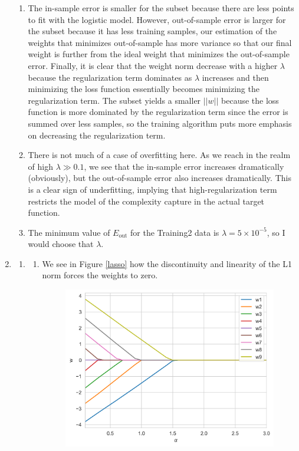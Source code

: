 \documentclass[12pt]{article}
\begin{document}
\begin{enumerate}[leftmargin=*]
\begin{enumerate}[label = \Alph*.]
\item The in-sample error is smaller for the subset because there are less points to fit with the logistic model. However, out-of-sample error is larger for the subset because it has less training samples, our estimation of the weights that minimizes out-of-sample has more variance so that our final weight is further from the ideal weight that minimizes the out-of-sample error. Finally, it is clear that the weight norm decrease with a higher $\lambda$ because the regularization term dominates as $\lambda$ increases and then minimizing the loss function essentially becomes minimizing the regularization term. The subset yields a smaller $||w||$ because the loss function is more dominated by the regularization term since the error is summed over less samples, so the training algorithm puts more emphasis on decreasing the regularization term.
\item There is not much of a case of overfitting here. As we reach in the realm of high $\lambda \gg 0.1$, we see that the in-sample error increases dramatically (obviously), but the out-of-sample error also increases dramatically. This is a clear sign of underfitting, implying that high-regularization term restricts the model of the complexity capture in the actual target function.
\item The minimum value of $E_{\text{out}}$ for the Training2 data is $\lambda = 5 \times 10^{-5}$, so I would choose that $\lambda$.
\end{enumerate}
\item
\begin{enumerate}[label = \Alph*.]
\item
\begin{enumerate}
\item We see in Figure \ref{lasso} how the discontinuity and linearity of the L1 norm forces the weights to zero.
\begin{figure}[h!]
\centering
\includegraphics[scale=0.6]{lassoalpha.png}

\end{figure}
\end{enumerate}
\end{enumerate}
\end{enumerate}
\end{document}
